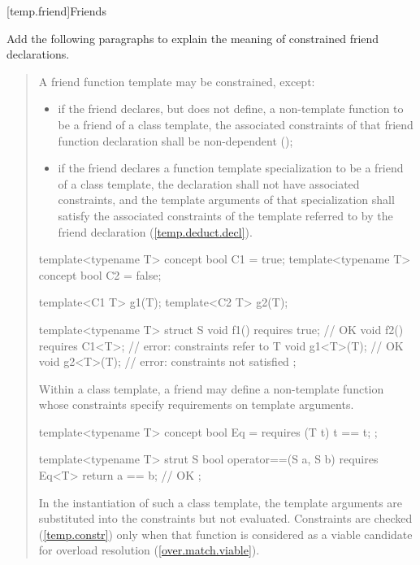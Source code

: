 \setcounter{subsection}{3}
[temp.friend]{Friends}

Add the following paragraphs to explain the meaning of constrained
friend declarations. 

\begin{quote}
\setcounter{Paras}{9}
\pnum
A friend function template may be constrained, except:
% 
\begin{itemize}
\item if the friend declares, but does not define, a non-template
function to be a friend of a class template, the associated constraints
of that friend function declaration shall be non-dependent
(); 
% 
\item if the friend declares a function template specialization to
be a friend of a class template, the declaration shall not have
associated constraints, and the template arguments of that specialization
shall satisfy the associated constraints of the template referred to
by the friend declaration (\ref{temp.deduct.decl}). 
\end{itemize}
% 
\enterexample
\begin{codeblock}
template<typename T> concept bool C1 = true;
template<typename T> concept bool C2 = false;

template<C1 T> g1(T);
template<C2 T> g2(T);

template<typename T>
  struct S {
    void f1() requires true;  // OK
    void f2() requires C1<T>; // error: constraints refer to T
    void g1<T>(T);            // OK
    void g2<T>(T);            // error: constraints not satisfied
  };
\end{codeblock}
\exitexample

\pnum
\enternote
Within a class template, a friend may define a non-template function
whose constraints specify requirements on template arguments.
\enterexample
\begin{codeblock}
template<typename T> concept bool Eq = requires (T t) { t == t; };

template<typename T>
  strut S {
    bool operator==(S a, S b) requires Eq<T> { return a == b; } // OK
  };
\end{codeblock}
\exitexample
In the instantiation of such a class template, the template
arguments are substituted into the constraints but not evaluated.
Constraints are checked (\ref{temp.constr}) only when
that function is considered as a viable candidate for overload resolution
(\ref{over.match.viable}).
\exitnote
\end{quote}



